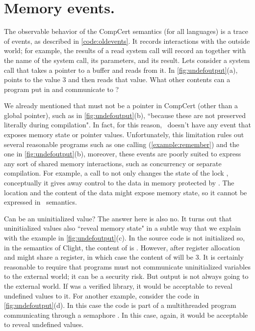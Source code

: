 \section{Memory events.}\label{sec:memevents}

The observable behavior of the CompCert semantics (for all languages) is a trace of events, as described in \autoref{code:oldevents}. It records interactions with the outside world; for example, the results of a read system call will record an  together with the name of the system call, its parameters, and its result. Lets consider a system call  that takes a pointer to a buffer and reads from it. In \autoref{fig:undefoutput}(a),  points to the value $3$ and  then reads that value.
What other contents  can a program put in  and communicate to ? 

We already mentioned that  must not be a pointer in CompCert (other than a global pointer), such as in \autoref{fig:undefoutput}(b), ``because these are not preserved literally during compilation"\cite{Leroy-Compcert-CACM}. %
In fact, for this reason, \compcert\ doesn't have any event that exposes memory state or pointer values. Unfortunately, this limitation rules out several reasonable programs such as one calling  (\autoref{example:remember}) and the one in \autoref{fig:undefoutput}(b), moreover, these events are poorly suited to express any sort of shared memory interactions, such as concurrency or separate compilation. For example, a call to  not only changes the state of the lock , conceptually it gives away control to the data in memory protected by . The location and the content of the data might expose memory state, so it cannot be expressed in \compcert\ semantics. 

Can  be an uninitialized value? The answer here is also no. %
It turns out that uninitialized values also ``reveal memory state" in a subtle way that we explain with the example in \autoref{fig:undefoutput}(c). In the source code  is not initialized so, in the semantics of Clight, the content of  is . However, after register allocation  and  might share a register, in which case the content of  will be $3$. It is certainly reasonable to require that programs must not communicate uninitialized variables to the external world; it can be a security risk. But output is not always going to the external world. If  was a verified library, it would be acceptable to reveal undefined values to it. For another example, consider the code in \autoref{fig:undefoutput}(d). In this case the code is part of a multithreaded program communicating through a semaphore . In this case, again, it would be acceptable to reveal undefined values.

